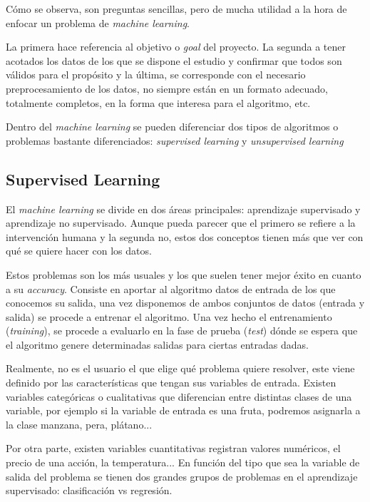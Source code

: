 Cómo se observa, son preguntas sencillas, pero de mucha utilidad a la hora de enfocar un problema de \textit{machine learning}. \par
La primera hace referencia al objetivo o \textit{goal} del proyecto. La segunda a tener acotados los datos de los que se dispone el estudio y confirmar que todos son válidos para el propósito y la última, se corresponde con el necesario preprocesamiento de los datos, no siempre están en un formato adecuado, totalmente completos, en la forma que interesa para el algoritmo, etc.\par 

Dentro del \textit{machine learning} se pueden diferenciar dos tipos de algoritmos o problemas bastante diferenciados: \textit{supervised learning} y \textit{unsupervised learning}

\subsection{Supervised Learning}
El \textit{machine learning} se divide en dos áreas principales: aprendizaje supervisado y aprendizaje no supervisado. Aunque pueda parecer que el primero se refiere a la intervención humana y la segunda no, estos dos conceptos tienen más que ver con qué se quiere hacer con los datos.\cite{cleverdata} \par 

Estos problemas son los más usuales y los que suelen tener mejor éxito en cuanto a su \textit{accuracy}. Consiste en aportar al algoritmo datos de entrada de los que conocemos su salida, una vez disponemos de ambos conjuntos de datos (entrada y salida) se procede a entrenar el algoritmo.\cite{ISL} Una vez hecho el entrenamiento (\textit{training}), se procede a evaluarlo en la fase de prueba (\textit{test}) dónde se espera que el algoritmo genere determinadas salidas para ciertas entradas dadas.\cite{ISL_python}\par 

Realmente, no es el usuario el que elige qué problema quiere resolver, este viene definido por las características que tengan sus variables de entrada. Existen variables categóricas o cualitativas que diferencian entre distintas clases de una variable, por ejemplo si la variable de entrada es una fruta, podremos asignarla a la clase manzana, pera, plátano... \par 

Por otra parte, existen variables cuantitativas registran valores numéricos, el precio de una acción, la temperatura...\cite{ISL}
En función del tipo que sea la variable de salida del problema se tienen dos grandes grupos de problemas en el aprendizaje supervisado: clasificación vs regresión.\par 

